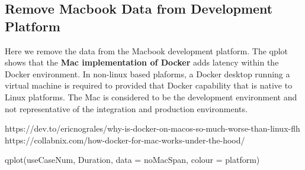 \documentclass[
  letterpaper,
  DIV=11,
  numbers=noendperiod]{scrartcl}
\newenvironment{Shaded}{\begin{snugshade}}{\end{snugshade}}
\newcommand{\AttributeTok}[1]{\textcolor[rgb]{0.40,0.45,0.13}{#1}}
\newcommand{\DecValTok}[1]{\textcolor[rgb]{0.68,0.00,0.00}{#1}}
\newcommand{\FunctionTok}[1]{\textcolor[rgb]{0.28,0.35,0.67}{#1}}
\newcommand{\NormalTok}[1]{\textcolor[rgb]{0.00,0.23,0.31}{#1}}
\newcommand{\OtherTok}[1]{\textcolor[rgb]{0.00,0.23,0.31}{#1}}
\newcommand{\SpecialCharTok}[1]{\textcolor[rgb]{0.37,0.37,0.37}{#1}}
\begin{document}
\hypertarget{remove-macbook-data-from-development-platform}{%
\subsection{Remove Macbook Data from Development
Platform}\label{remove-macbook-data-from-development-platform}}

Here we remove the data from the Macbook development platform. The qplot
shows that the \textbf{Mac implementation of Docker} adds latency within
the Docker environment. In non-linux based plaforms, a Docker desktop
running a virtual machine is required to provided that Docker capability
that is native to Linux platforms. The Mac is considered to be the
development environment and not representative of the integration and
production environments.

https://dev.to/ericnograles/why-is-docker-on-macos-so-much-worse-than-linux-flh\\
https://collabnix.com/how-docker-for-mac-works-under-the-hood/

\begin{Shaded}
\end{Shaded}

\begin{Shaded}
\begin{Highlighting}[]
\FunctionTok{qplot}\NormalTok{(useCaseNum, Duration, }\AttributeTok{data =}\NormalTok{ noMacSpan, }\AttributeTok{colour =}\NormalTok{ platform)}
\end{Highlighting}
\end{Shaded}
\end{document}
